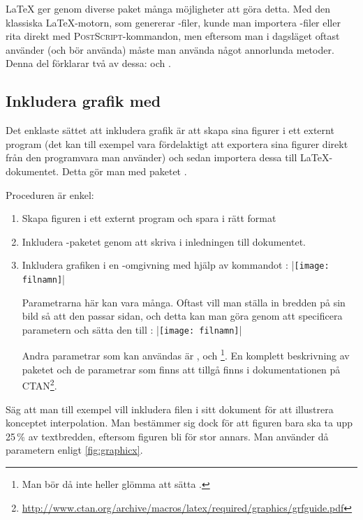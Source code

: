 \documentclass[lang=sv,ptsize=10pt,font=none,nomath,titles=bf,../../a4.tex]{subfiles}
\begin{document}
\LaTeX{} ger genom diverse paket många möjligheter att göra detta. Med den
klassiska \LaTeX{}-motorn, som genererar \DVI-filer, kunde man importera
\EPS-filer eller rita direkt med \textsc{PostScript}-kommandon, men
eftersom man i dagsläget oftast använder (och bör använda) \pdfLaTeX{}
måste man använda något annorlunda metoder. Denna del förklarar två av
dessa:  och \PGFTikZ.

\subsection{Inkludera grafik med }
Det enklaste sättet att inkludera grafik är att skapa sina figurer i ett
externt program (det kan till exempel vara fördelaktigt att exportera sina
figurer direkt från den programvara man använder) och sedan importera
dessa till \LaTeX{}-dokumentet. Detta gör man med paketet .

Proceduren är enkel:
\begin{enumerate}
	\item Skapa figuren i ett externt program och spara i rätt format
	
	\item Inkludera -paketet genom att skriva
	 i inledningen till dokumentet.
	
	\item Inkludera grafiken i en -omgivning med hjälp av
	kommandot :
	\latex|\texttt{[image: filnamn]}|
	
	Parametrarna här kan vara många. Oftast vill man ställa in bredden på
	sin bild så att den passar sidan, och detta kan man göra genom att
	specificera parametern  och sätta den till
	:
	\latex|\texttt{[image: filnamn]}|
	
	Andra parametrar som kan användas är , 
	och \footnote{Man bör då inte heller glömma att sätta
	.\hfil}. En komplett beskrivning av paketet och de 
	parametrar som finns att tillgå finns i dokumentationen på
	CTAN\footnote{\url{http://www.ctan.org/archive/macros/latex/required/graphics/grfguide.pdf}}.
\end{enumerate}

Säg att man till exempel vill inkludera filen 
i sitt dokument för att illustrera konceptet interpolation. Man bestämmer
sig dock för att figuren bara ska ta upp 25\,\% av textbredden, eftersom
figuren bli för stor annars. Man använder då parametern 
enligt \cref{fig:graphicx}.%
\end{document}
